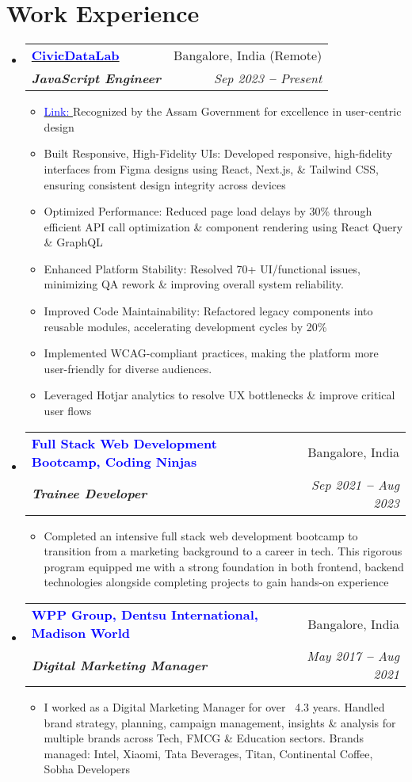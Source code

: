\documentclass[letterpaper,11pt]{article}
\makeatletter
\newcommand{\resumeItem}[1]{
  \item\footnotesize{
    {#1 \vspace{-2pt}}
  }
}
\newcommand{\resumeSubheading}[4]{
  \vspace{-2pt}\item
    \begin{tabular*}{0.97\textwidth}[t]{l@{\extracolsep{\fill}}r}
      \small\textbf{#1} & \footnotesize #2 \\
      \textit{\footnotesize#3} & \textit{\footnotesize #4} \\
    \end{tabular*}\vspace{-5pt}
}
\newcommand{\resumeSubHeadingListStart}{\begin{itemize}[leftmargin=0.15in, label={}]}
\newcommand{\resumeSubHeadingListEnd}{\end{itemize}}
\newcommand{\resumeItemListStart}{\begin{itemize}}
\newcommand{\resumeItemListEnd}{\end{itemize}\vspace{-10pt}}
\makeatother
\begin{document}
\section{Work Experience}
\vspace{1pt}
\resumeSubHeadingListStart
\resumeSubheading
{\href{https://civicdatalab.in}{\textcolor{blue}{CivicDataLab}}}{Bangalore, India (Remote)}
{\textbf{JavaScript Engineer}}{Sep 2023 \textbf{--} Present}
\vspace{1pt}
\resumeItemListStart
\resumeItem{ {\href{https://drr.open-contracting.in/en/}{\textcolor{blue}{Link: }}} Recognized by the Assam Government for excellence in user-centric design}
\resumeItem{Built Responsive, High-Fidelity UIs: Developed responsive, high-fidelity interfaces from Figma
designs using React, Next.js, \& Tailwind CSS, ensuring consistent design integrity across
devices}
\resumeItem{Optimized Performance: Reduced page load delays by 30\% through efficient API call
optimization \& component rendering using React Query \& GraphQL}
\resumeItem{Enhanced Platform Stability: Resolved 70+ UI/functional issues, minimizing QA rework \&
improving overall system reliability.}
\resumeItem{Improved Code Maintainability: Refactored legacy components into reusable modules,
accelerating development cycles by 20\%}
\resumeItem{Implemented WCAG-compliant practices, making the platform more
user-friendly for diverse audiences.}
\resumeItem{Leveraged Hotjar analytics to resolve UX bottlenecks \& improve critical user flows}
\resumeItemListEnd


\resumeSubheading
{\textbf{\textcolor{blue}{Full Stack Web Development Bootcamp, Coding Ninjas}}}{Bangalore, India}
{\textbf{Trainee Developer}}{Sep 2021 \textbf{--} Aug 2023}
\vspace{1pt}
\resumeItemListStart
\resumeItem{Completed an intensive full stack web development bootcamp to transition from a marketing
background to a career in tech. This rigorous program equipped me with a strong foundation in
both frontend, backend technologies alongside completing projects to gain hands-on experience}

\resumeItemListEnd


\resumeSubheading
{\textcolor{blue}{WPP Group, Dentsu International, Madison World}}{Bangalore, India}
{\textbf{Digital Marketing Manager}}{May 2017 \textbf{--} Aug 2021}
\vspace{1pt}
\resumeItemListStart
\resumeItem{I worked as a Digital Marketing Manager for over ~4.3 years. Handled brand strategy, planning,
campaign management, insights \& analysis for multiple brands across Tech, FMCG \& Education
sectors. Brands managed: Intel, Xiaomi, Tata Beverages, Titan, Continental Coffee, Sobha
Developers
}
\resumeItemListEnd
\resumeSubHeadingListEnd
\end{document}
